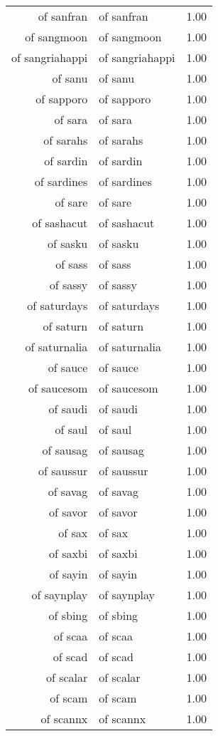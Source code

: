 \begin{table}[ht]
\begin{tabular}{rlr}
  of sanfran & of sanfran & 1.00 \\ 
  of sangmoon & of sangmoon & 1.00 \\ 
  of sangriahappi & of sangriahappi & 1.00 \\ 
  of sanu & of sanu & 1.00 \\ 
  of sapporo & of sapporo & 1.00 \\ 
  of sara & of sara & 1.00 \\ 
  of sarahs & of sarahs & 1.00 \\ 
  of sardin & of sardin & 1.00 \\ 
  of sardines & of sardines & 1.00 \\ 
  of sare & of sare & 1.00 \\ 
  of sashacut & of sashacut & 1.00 \\ 
  of sasku & of sasku & 1.00 \\ 
  of sass & of sass & 1.00 \\ 
  of sassy & of sassy & 1.00 \\ 
  of saturdays & of saturdays & 1.00 \\ 
  of saturn & of saturn & 1.00 \\ 
  of saturnalia & of saturnalia & 1.00 \\ 
  of sauce & of sauce & 1.00 \\ 
  of saucesom & of saucesom & 1.00 \\ 
  of saudi & of saudi & 1.00 \\ 
  of saul & of saul & 1.00 \\ 
  of sausag & of sausag & 1.00 \\ 
  of saussur & of saussur & 1.00 \\ 
  of savag & of savag & 1.00 \\ 
  of savor & of savor & 1.00 \\ 
  of sax & of sax & 1.00 \\ 
  of saxbi & of saxbi & 1.00 \\ 
  of sayin & of sayin & 1.00 \\ 
  of saynplay & of saynplay & 1.00 \\ 
  of sbing & of sbing & 1.00 \\ 
  of scaa & of scaa & 1.00 \\ 
  of scad & of scad & 1.00 \\ 
  of scalar & of scalar & 1.00 \\ 
  of scam & of scam & 1.00 \\ 
  of scannx & of scannx & 1.00 \\ 

\end{tabular}
\end{table}
